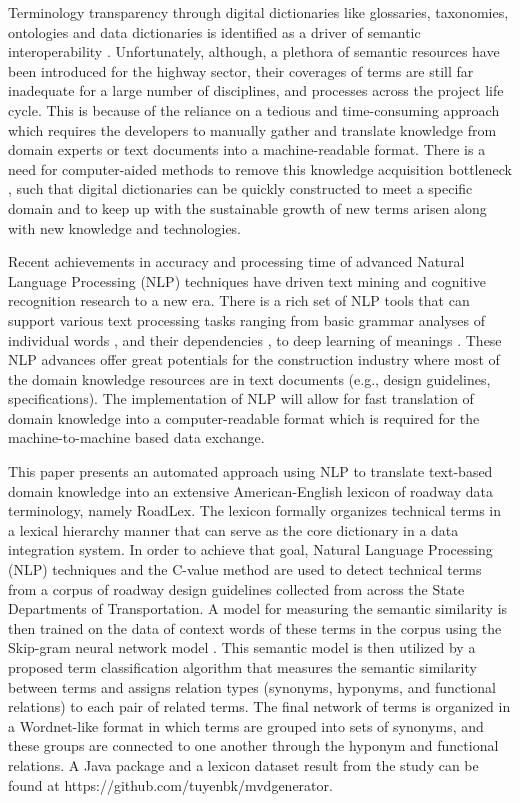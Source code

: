 \documentclass[Journal,InsideFigs, DoubleSpace]{ascelike} %
\begin{document}
Terminology transparency through digital dictionaries like glossaries, taxonomies, ontologies and data dictionaries is identified as a driver of semantic interoperability \cite{ouksel99}. Unfortunately, although, a plethora of semantic resources have been introduced for the highway sector, their coverages of terms are still far inadequate for a large number of disciplines, and processes across the project life cycle. This is because of the reliance on a  tedious and time-consuming approach which requires the developers to manually gather and translate knowledge from domain experts or text documents into a machine-readable format. There is a need for computer-aided methods to remove this knowledge acquisition bottleneck \cite{mounce10}, such that digital dictionaries can be quickly constructed to meet a specific domain and to keep up with the sustainable growth of new terms arisen along with new knowledge and technologies.
\par
Recent achievements in accuracy and processing time of advanced Natural Language Processing (NLP) techniques have driven text mining and cognitive recognition research to a new era. There is a rich set of NLP tools that can support various text processing tasks ranging from basic grammar analyses of individual words \cite{Toutanova03,Cunningham02}, and their dependencies \cite{chen14}, to deep learning of meanings \cite{mikolov13a,pennington2014glove}. These NLP advances offer great potentials for the construction industry where most of the domain knowledge resources are in text documents (e.g., design guidelines, specifications). The implementation of NLP will allow for fast translation of domain knowledge into a computer-readable format which is required for the machine-to-machine based data exchange.
\par
This paper presents an automated approach using NLP to translate text-based domain knowledge into an extensive American-English lexicon of roadway data terminology, namely RoadLex. The lexicon formally organizes technical terms in a lexical hierarchy manner that can serve as the core dictionary in a data integration system. In order to achieve that goal, Natural Language Processing (NLP) techniques and the C-value method \cite{frantzi20} are used to detect technical terms from a corpus of roadway design guidelines collected from across the State Departments of Transportation. A model for measuring the semantic similarity is then trained on the data of context words of these terms in the corpus using the Skip-gram neural network model \cite{mikolov13a}. This semantic model is then utilized by a proposed term classification algorithm that measures the semantic similarity between terms and assigns relation types (synonyms, hyponyms, and functional relations) to each pair of related terms. The final network of terms is organized in a Wordnet-like format in which terms are grouped into sets of synonyms, and these groups are connected to one another through the hyponym and functional relations. A Java package and a lexicon dataset result from the study can be found at https://github.com/tuyenbk/mvdgenerator.
\end{document}
